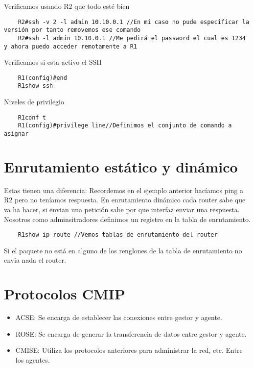 Verificamos usando R2 que todo esté bien 
\begin{lstlisting}
    R2#ssh -v 2 -l admin 10.10.0.1 //En mi caso no pude especificar la versión por tanto removemos ese comando
    R2#ssh -l admin 10.10.0.1 //Me pedirá el password el cual es 1234 y ahora puedo acceder remotamente a R1
\end{lstlisting}
Verificamos si esta activo el SSH 
\begin{lstlisting}
    R1(config)#end 
    R1show ssh
\end{lstlisting}

Niveles de privilegio 
\begin{lstlisting}
    R1conf t
    R1(config)#privilege line//Definimos el conjunto de comando a asignar
\end{lstlisting}

\section{Enrutamiento estático y dinámico}
Estas tienen una diferencia: Recordemos en el ejemplo anterior hacíamos ping a R2 pero no teníamos respuesta. En enrutamiento dinámico cada router sabe que va ha hacer, si envian una petición sabe por que interfaz enviar una respuesta.\\
Nosotros como adminsitradores definimos un registro en la tabla de enrutamiento.

\begin{lstlisting}
    R1show ip route //Vemos tablas de enrutamiento del router  
\end{lstlisting}

Si el paquete no está en alguno de los renglones de la tabla de enrutamiento no envia nada el router.       

\section{Protocolos CMIP}

\begin{itemize}
    \item {ACSE: Se encarga de establecer las conexiones entre gestor y agente.}
    \item {ROSE: Se encarga de generar la transferencia de datos entre gestor y agente.}
    \item {CMISE: Utiliza los protocolos anteriores para administrar la red, etc. Entre los agentes.}
\end{itemize}

